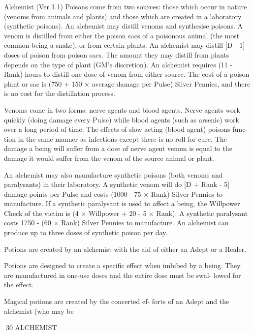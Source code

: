 \begin{Chapter}{Alchemist (Ver 1.1)}
Poisons come from two sources: those which occur 
in  nature  (venoms  from  animals  and  plants)  and 
those  which  are  created  in  a  laboratory  (synthetic 
poisons).  An  alchemist  may  distill  venoms  and 
synthesise  poisons.  A  venom  is  distilled  from 
either  the  poison  sacs  of  a  poisonous  animal  (the 
most  common  being  a  snake),  or  from  certain 
plants.  An  alchemist  may  distill  [D  -  1]  doses  of 
poison  from  poison  sacs.  The  amount  they  may 
distill  from  plants  depends  on  the  type  of  plant 
(GM’s  discretion).  An  alchemist  requires  (11  - 
Rank)  hours  to  distill  one  dose  of  venom  from 
either  source.  The  cost  of  a  poison  plant  or  sac  is 
(750  +  150  ×  average  damage  per  Pulse)  Silver 
Pennies,  and  there  is  no  cost  for  the  distillation 
process. 

Venoms  come  in  two  forms:  nerve  agents  and 
blood  agents.  Nerve  agents  work  quickly  (doing 
damage  every  Pulse)  while  blood  agents  (such  as 
arsenic)  work  over  a  long  period  of  time.  The 
effects  of  slow  acting  (blood  agent)  poisons  func-
tion in the same manner as infections except there 
is no roll for cure. The damage a being will suffer 
from  a  dose  of  nerve  agent  venom  is  equal  to  the 
damage  it  would  suffer  from  the  venom  of  the 
source animal or plant. 

An  alchemist  may  also  manufacture  synthetic 
poisons  (both  venoms  and  paralysants)  in  their 
laboratory. A synthetic venom will do [D + Rank - 
5] damage points per Pulse and costs (1000  - 75 × 
Rank) Silver Pennies to manufacture. If a synthetic 
paralysant is used to affect a being, the Willpower 
Check  of  the  victim is  (4  × Willpower  +  20  -  5  × 
Rank).  A  synthetic  paralysant  costs  1750  -  (60  × 
Rank) Silver Pennies to manufacture. An alchemist 
can  produce  up  to  three  doses  of  synthetic  poison 
per day. 

Potions are created by an alchemist with the aid 
of either an Adept or a Healer. 

Potions  are  designed  to  create  a  specific  effect 
when  imbibed  by  a  being.  They  are  manufactured 
in one-use doses and the entire dose must be swal-
lowed for the effect. 

Magical  potions  are  created  by  the  concerted  ef-
forts  of  an  Adept  and  the  alchemist  (who  may  be 

30 ALCHEMIST 


\end{Chapter}
